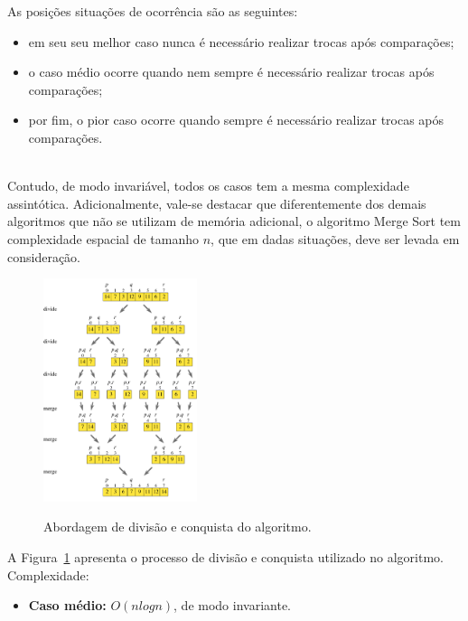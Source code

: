 \documentclass[conference]{IEEEtran}
\begin{document}
As posições situações de ocorrência são as seguintes:
\begin{itemize}
\item em seu seu melhor caso nunca é necessário realizar trocas após comparações;
\item o caso médio ocorre quando nem sempre é necessário realizar trocas após comparações;
\item por fim, o pior caso ocorre quando sempre é necessário realizar trocas após comparações.
\end{itemize}~\\

Contudo, de modo invariável, todos os casos tem a mesma complexidade assintótica. Adicionalmente, vale-se destacar que diferentemente dos demais algoritmos que não se utilizam de memória adicional, o algoritmo Merge Sort tem complexidade espacial de tamanho $n$, que em dadas situações, deve ser levada em consideração.

\begin{figure}
  
  \centering
    \includegraphics[width=0.4\textwidth]{images/merge.png}
    \label{image:merge}
  \caption{Abordagem de divisão e conquista do algoritmo.}
\end{figure}

A Figura~\ref{image:merge} apresenta o processo de divisão e conquista utilizado no algoritmo.\\

Complexidade:
\begin{itemize}
\item \textbf{Caso médio:} $O (nlog n)$, de modo invariante.
\end{itemize}

~\\
\end{document}
